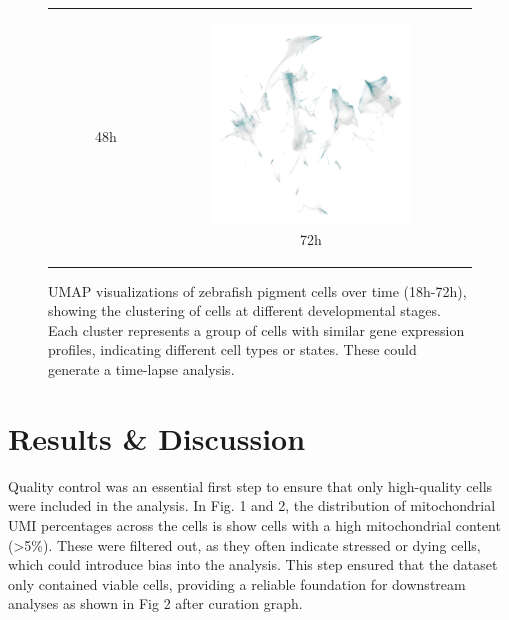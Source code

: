 \documentclass[runningheads]{llncs}
\begin{document}
\begin{figure}[H]
{\begin{tabular}{ccc}
\begin{subfigure}[b]{0.3\textwidth}
        \caption{48h}
        \label{fig:umap_48h}
      \end{subfigure} &
      \begin{subfigure}[b]{0.3\textwidth}
        \centering
        \includegraphics[width=\textwidth]{fig_umap_72h_optimized.png}
        \caption{72h}
        \label{fig:umap_72h}
      \end{subfigure}
    \end{tabular}%
  }
  \caption{UMAP visualizations of zebrafish pigment cells over time (18h-72h), showing the clustering of cells at different developmental stages. Each cluster represents a group of cells with similar gene expression profiles, indicating different cell types or states. These could generate a time-lapse analysis.}
  \label{fig:umap_all}
\end{figure}

\section{Results \& Discussion}

Quality control was an essential first step to ensure that only high-quality cells were included in the analysis. In Fig. 1 and 2, the distribution of mitochondrial UMI percentages across the cells is show cells with a high mitochondrial content (>5\%). These were filtered out, as they often indicate stressed or dying cells, which could introduce bias into the analysis. This step ensured that the dataset only contained viable cells, providing a reliable foundation for downstream analyses as shown in Fig 2 after curation graph.
\end{document}
